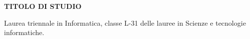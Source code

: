 \begin{minipage}[c]{0.3\textwidth}
	\textbf{TITOLO DI STUDIO}
\end{minipage}%
\hfill
\hfill
\begin{minipage}[t]{0.6\textwidth}		
	Laurea triennale in Informatica, classe L-31 delle lauree in Scienze e tecnologie informatiche.\vspace{2mm}\\
	\vspace{1mm}
\end{minipage}%
